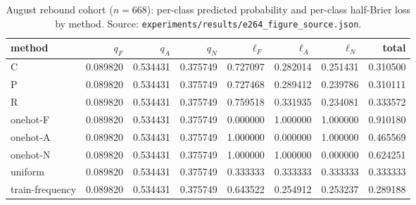 \begin{table}[h]\centering
\caption{August rebound cohort ($n=668$): per-class predicted probability and per-class
half-Brier loss by method. Source: \texttt{experiments/results/e264\_figure\_source.json}.}
\label{tab:augclassreb}
\begin{tabular}{lrrrrrrr}
\toprule
method & $q_F$ & $q_A$ & $q_N$ & $\ell_F$ & $\ell_A$ & $\ell_N$ & total \\
\midrule
C & 0.089820 & 0.534431 & 0.375749 & 0.727097 & 0.282014 & 0.251431 & 0.310500 \\
P & 0.089820 & 0.534431 & 0.375749 & 0.727468 & 0.289412 & 0.239786 & 0.310111 \\
R & 0.089820 & 0.534431 & 0.375749 & 0.759518 & 0.331935 & 0.234081 & 0.333572 \\
onehot-F & 0.089820 & 0.534431 & 0.375749 & 0.000000 & 1.000000 & 1.000000 & 0.910180 \\
onehot-A & 0.089820 & 0.534431 & 0.375749 & 1.000000 & 0.000000 & 1.000000 & 0.465569 \\
onehot-N & 0.089820 & 0.534431 & 0.375749 & 1.000000 & 1.000000 & 0.000000 & 0.624251 \\
uniform & 0.089820 & 0.534431 & 0.375749 & 0.333333 & 0.333333 & 0.333333 & 0.333333 \\
train-frequency & 0.089820 & 0.534431 & 0.375749 & 0.643522 & 0.254912 & 0.253237 & 0.289188 \\
\bottomrule
\end{tabular}\end{table}

